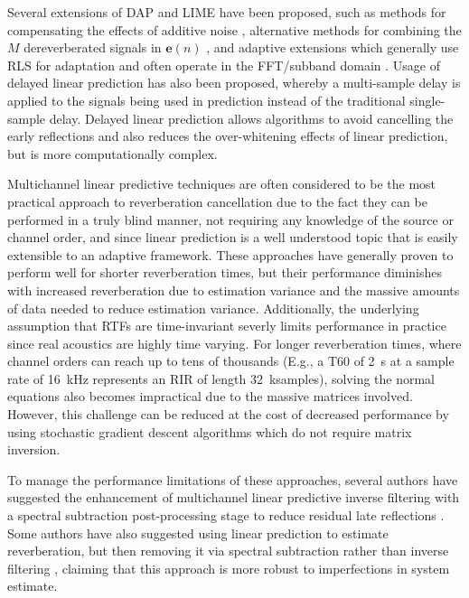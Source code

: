Several extensions of DAP and LIME have been proposed, such as methods for compensating the effects of additive noise \citep[e.g., ][]{triki2007multivariate}, alternative methods for combining the $M$ dereverberated signals in $\boldsymbol{e}(n)$ \citep[e.g., ][]{triki2008robust}, and adaptive extensions which generally use RLS for adaptation and often operate in the FFT/subband domain \citep[e.g., ][]{jukic2016adaptive, jukic2016general}. Usage of delayed linear prediction \citep[i.e., multi-step linear prediction originally presented by ][]{gesbert1997robust} has also been proposed, whereby a multi-sample delay is applied to the signals being used in prediction instead of the traditional single-sample delay. Delayed linear prediction allows algorithms to avoid cancelling the early reflections and also reduces the over-whitening effects of linear prediction, but is more computationally complex. 

Multichannel linear predictive techniques are often considered to be the most practical approach to reverberation cancellation due to the fact they can be performed in a truly blind manner, not requiring any knowledge of the source or channel order, and since linear prediction is a well understood topic that is easily extensible to an adaptive framework. These approaches have generally proven to perform well for shorter reverberation times, but their performance diminishes with increased reverberation due to estimation variance and the massive amounts of data needed to reduce estimation variance. Additionally, the underlying assumption that RTFs are time-invariant severly limits performance in practice since real acoustics are highly time varying. For longer reverberation times, where channel orders can reach up to tens of thousands (E.g., a T60 of \qty{2}{\second} at a sample rate of \qty{16}{\kilo\hertz} represents an RIR of length \qty{32}{\kilo samples}), solving the normal equations also becomes impractical due to the massive matrices involved. However, this challenge can be reduced at the cost of decreased performance by using stochastic gradient descent algorithms which do not require matrix inversion.

To manage the performance limitations of these approaches, several authors have suggested the enhancement of multichannel linear predictive inverse filtering with a spectral subtraction post-processing stage to reduce residual late reflections \citep[e.g., ][]{furuya2007robust}. Some authors have also suggested using linear prediction to estimate reverberation, but then removing it via spectral subtraction rather than inverse filtering \citep[e.g., ][]{kinoshita2007multi, nakatani2008blind, nakatani2010speech}, claiming that this approach is more robust to imperfections in system estimate. 



